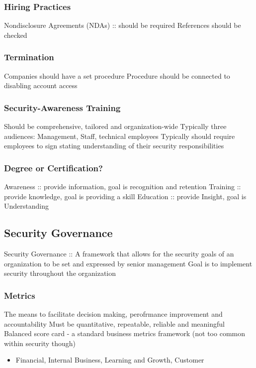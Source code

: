 \documentclass[11pt]{article}
\begin{document}
\subsubsection{Hiring Practices}
\label{sec:org69c5fb6}
Nondisclosure Agreements (NDAs) :: should be required
References should be checked
\subsubsection{Termination}
\label{sec:orgb204e6c}
Companies should have a set procedure
Procedure should be connected to disabling account access
\subsubsection{Security-Awareness Training}
\label{sec:orgd3c5d20}
Should be comprehensive, tailored and organization-wide
Typically three audiences: Management, Staff, technical employees
Typically should require employees to sign stating understanding of their security responsibilities 

\subsubsection{Degree or Certification?}
\label{sec:orgebf7ce3}
Awareness :: provide information, goal is recognition and retention
Training :: provide knowledge, goal is providing a skill
Education :: provide Insight, goal is Understanding
\subsection{Security Governance}
\label{sec:org2c49b57}
Security Governance :: A framework that allows for the security goals of an organization to be set and expressed by senior management
Goal is to implement security throughout the organization
\subsubsection{Metrics}
\label{sec:org9dc9967}
The means to facilitate decision making, perofrmance improvement and accountability
Must be quantitative, repeatable, reliable and meaningful
Balanced score card - a standard business metrics framework (not too common within security though)
\begin{itemize}
\item Financial, Internal Business, Learning and Growth, Customer
\end{itemize}
\end{document}
